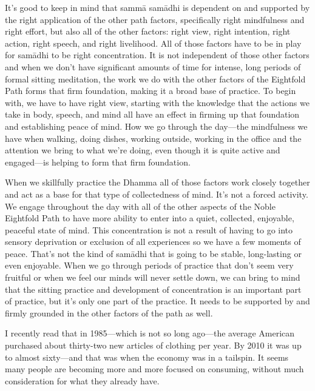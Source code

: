 It's good to keep in mind that sammā samādhi is dependent on and 
supported by the right application of the other path factors, 
specifically right mindfulness and right effort, but also all of the 
other factors: right view, right intention, right action, right speech, 
and right livelihood. All of those factors have to be in play for 
samādhi to be right concentration. It is not independent of those 
other factors and when we don't have significant amounts of time for 
intense, long periods of formal sitting meditation, the work we do with 
the other factors of the Eightfold Path forms that firm foundation, 
making it a broad base of practice. To begin with, we have to have 
right view, starting with the knowledge that the actions we take in 
body, speech, and mind all have an effect in firming up that foundation 
and establishing peace of mind. How we go through the day---the 
mindfulness we have when walking, doing dishes, working outside, 
working in the office and the attention we bring to what we're doing, 
even though it is quite active and engaged---is helping to form that 
firm foundation.

When we skillfully practice the Dhamma all of those factors work 
closely together and act as a base for that type of collectedness of 
mind. It's not a forced activity. We engage throughout the day with all 
of the other aspects of the Noble Eightfold Path to have more ability 
to enter into a quiet, collected, enjoyable, peaceful state of mind. 
This concentration is not a result of having to go into sensory 
deprivation or exclusion of all experiences so we have a few moments of 
peace. That's not the kind of samādhi that is going to be stable, 
long-lasting or even enjoyable. When we go through periods of practice 
that don't seem very fruitful or when we feel our minds will never 
settle down, we can bring to mind that the sitting practice and 
development of concentration is an important part of practice, but it's 
only one part of the practice. It needs to be supported by and firmly 
grounded in the other factors of the path as well.


I recently read that in 1985---which is not so long ago---the average 
American purchased about thirty-two new articles of clothing per year. 
By 2010 it was up to almost sixty---and that was when the economy was 
in a tailspin. It seems many people are becoming more and more focused 
on consuming, without much consideration for what they already have.

